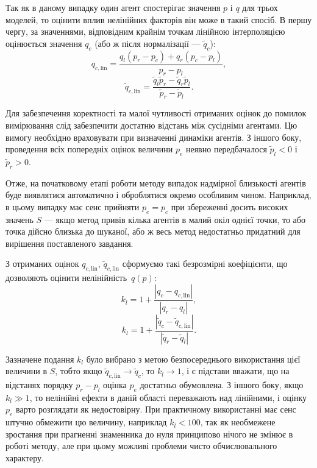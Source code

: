 Так як в даному випадку один агент спостерігає значення
$p$ і
$q$ для трьох моделей, то оцінити вплив нелінійних факторів він
може в такий спосіб. В першу чергу, за значеннями, відповідним
крайнім точкам лінійною інтерполяцією оцінюється значення
$q_c$ (або ж після нормалізації ---
$\tilde{q}_c$):
%
\begin{equation}
 q_{c,\mathrm{lin}}
  =
  \frac{  q_l \left( p_r - p_c \right) + q_r \left( p_c - p_l \right) }{p_r-p_l},
  \label{atu:eq:q_clin}
\end{equation}
%
\begin{equation}
  \tilde{q}_{c,\mathrm{lin}}
  =
  \frac{ \tilde{q}_l \tilde{p}_r - \tilde{q}_r \tilde{p}_l }{\tilde{p}_r-\tilde{p}_l}  .
  \label{atu:eq:qr_clin}
\end{equation}

Для забезпечення коректності та малої чутливості отриманих
оцінок до помилок вимірювання слід забезпечити достатню
відстань між сусідніми агентами. Цю вимогу необхідно
враховувати при визначенні динаміки агентів. З іншого боку,
проведення всіх попередніх оцінок величини
$p_e$ неявно передбачалося
$\tilde{p}_l <0$ і
$\tilde{p}_r> 0$.

Отже, на початковому етапі роботи методу випадок надмірної
близькості агентів буде виявлятися автоматично і оброблятися
окремо особливим чином. Наприклад, в цьому випадку має сенс
прийняти
$p_e = p_c$ при збереженні досить високих значень
$S$ --- якщо метод привів кілька агентів в малий окіл однієї
точки, то або точка дійсно близька до шуканої, або ж весь метод
недостатньо придатний для вирішення поставленого завдання.


З отриманих оцінок
$q_{c, \mathrm{lin}}$,
$\tilde{q}_{c, \mathrm{lin}}$
сформуємо такі безрозмірні коефіцієнти, що
дозволяють оцінити нелінійність~$q(p)$:
%
\begin{equation}
  k_l = 1 + \frac{|q_c - q_{c,\mathrm{lin}}|}{|q_r-q_l|} ,
  \label{atu:eq:k_l1}
\end{equation}
%
\begin{equation}
  k_l = 1 + \frac{|\tilde{q}_c - \tilde{q}_{c,\mathrm{lin}}|}{ |\tilde{q}_r-\tilde{q}_l|} .
  \label{atu:eq:k_l2}
\end{equation}

Зазначене подання
$k_l$ було вибрано з метою безпосереднього використання цієї
величини в
$S$, тобто якщо
$\tilde{q}_{c, \mathrm{lin}} \to \tilde{q}_c$, то
$k_l \to 1$, і є підстави вважати, що на відстанях порядку
$p_r-p_l$ оцінка
$p_e$ достатньо обумовлена. З іншого боку, якщо
$k_l \gg 1$, то нелінійні ефекти в даній області переважають над
лінійними, і оцінку
$p_e$ варто розглядати як недостовірну. При практичному
використанні має сенс штучно обмежити цю величину, наприклад
$k_l <100$, так як необмежене зростання при прагненні знаменника
до нуля принципово нічого не змінює в роботі методу, але при
цьому можливі проблеми чисто обчислювального характеру.



